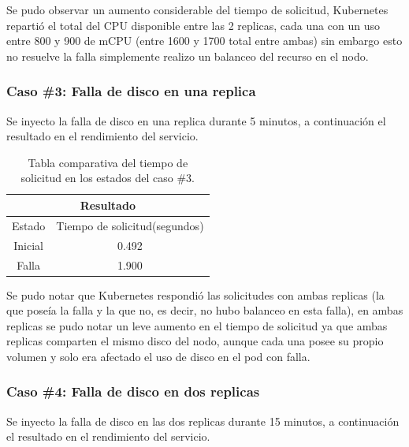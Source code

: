 \par Se pudo observar un aumento considerable del tiempo de solicitud, Kubernetes repartió el total del CPU disponible entre las 2 replicas, cada una con un uso entre 800 y 900 de mCPU (entre 1600 y 1700 total entre ambas) sin embargo esto no resuelve la falla simplemente realizo un balanceo del recurso en el nodo.\\

\subsubsection{Caso \#3: Falla de disco en una replica}

\par Se inyecto la falla de disco en una replica durante 5 minutos, a continuación el resultado en el rendimiento del servicio.\\

\begin{table}[ht!]
\begin{center}
\begin{tabular}{ |c|c| } 
 \hline
 \multicolumn{2}{|c|}{Resultado} \\
 \hline
 \hline
 Estado & Tiempo de solicitud(segundos)\\
 \hline
 Inicial & 0.492\\
 Falla & 1.900\\
 \hline
\end{tabular}
\end{center}
\caption{Tabla comparativa del tiempo de solicitud en los estados del caso \#3.}
\label{tab:tabla47}
\end{table}

\par Se pudo notar que Kubernetes respondió las solicitudes con ambas replicas (la que poseía la falla y la que no, es decir, no hubo balanceo en esta falla), en ambas replicas se pudo notar un leve aumento en el tiempo de solicitud ya que ambas replicas comparten el mismo disco del nodo, aunque cada una posee su propio volumen y solo era afectado el uso de disco en el pod con falla.\\

\subsubsection{Caso \#4: Falla de disco en dos replicas}

\par Se inyecto la falla de disco en las dos replicas durante 15 minutos, a continuación el resultado en el rendimiento del servicio.\\

